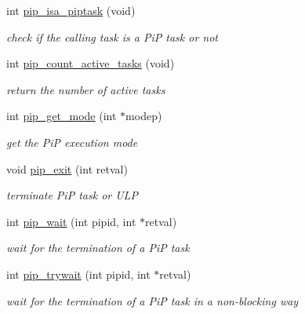 \begin{DoxyCompactItemize}
\item 
int \hyperlink{group__libpip_ga4b6905e1eb5ffa6427d72d7e73408639}{pip\-\_\-isa\-\_\-piptask} (void)
\begin{DoxyCompactList}\small\item\em check if the calling task is a Pi\-P task or not \end{DoxyCompactList}\end{DoxyCompactItemize}
\begin{DoxyCompactItemize}
\item 
int \hyperlink{group__libpip_gac45cbabfd20fa2f8f4e9004474922137}{pip\-\_\-count\-\_\-active\-\_\-tasks} (void)
\begin{DoxyCompactList}\small\item\em return the number of active tasks \end{DoxyCompactList}\end{DoxyCompactItemize}
\begin{DoxyCompactItemize}
\item 
int \hyperlink{group__libpip_gab603f68c1ce972a5f3bfb8c95fcfb555}{pip\-\_\-get\-\_\-mode} (int $\ast$modep)
\begin{DoxyCompactList}\small\item\em get the Pi\-P execution mode \end{DoxyCompactList}\end{DoxyCompactItemize}
\begin{DoxyCompactItemize}
\item 
void \hyperlink{group__libpip_ga839952b6edf6edc90d92c06c7cc6784b}{pip\-\_\-exit} (int retval)
\begin{DoxyCompactList}\small\item\em terminate Pi\-P task or U\-L\-P \end{DoxyCompactList}\end{DoxyCompactItemize}
\begin{DoxyCompactItemize}
\item 
int \hyperlink{group__libpip_ga3adad6a3e2311a46b2bfdd9d9062811b}{pip\-\_\-wait} (int pipid, int $\ast$retval)
\begin{DoxyCompactList}\small\item\em wait for the termination of a Pi\-P task \end{DoxyCompactList}\end{DoxyCompactItemize}
\begin{DoxyCompactItemize}
\item 
int \hyperlink{group__libpip_ga02cab8b77b62ffcd98bd1bbb1e32b7e7}{pip\-\_\-trywait} (int pipid, int $\ast$retval)
\begin{DoxyCompactList}\small\item\em wait for the termination of a Pi\-P task in a non-\/blocking way \end{DoxyCompactList}\end{DoxyCompactItemize}
